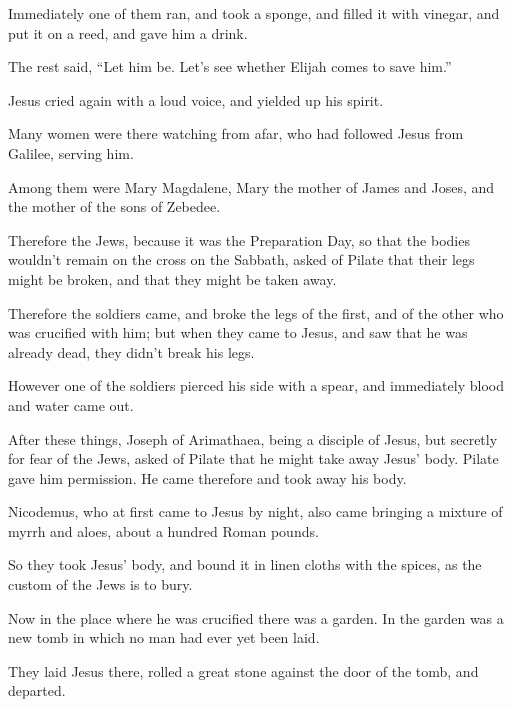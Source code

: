 Immediately one of them ran, and took a sponge, and filled it with vinegar, and put it on a reed, and gave him a drink.

The rest said, “Let him be. Let’s see whether Elijah comes to save him.”

Jesus cried again with a loud voice, and yielded up his spirit.

Many women were there watching from afar, who had followed Jesus from Galilee, serving him.

Among them were Mary Magdalene, Mary the mother of James and Joses, and the mother of the sons of Zebedee.

Therefore the Jews, because it was the Preparation Day, so that the bodies wouldn’t remain on the cross on the Sabbath, asked of Pilate that their legs might be broken, and that they might be taken away.

Therefore the soldiers came, and broke the legs of the first, and of the other who was crucified with him; but when they came to Jesus, and saw that he was already dead, they didn’t break his legs.

However one of the soldiers pierced his side with a spear, and immediately blood and water came out.

After these things, Joseph of Arimathaea, being a disciple of Jesus, but secretly for fear of the Jews, asked of Pilate that he might take away Jesus’ body. Pilate gave him permission. He came therefore and took away his body.

Nicodemus, who at first came to Jesus by night, also came bringing a mixture of myrrh and aloes, about a hundred Roman pounds.

So they took Jesus’ body, and bound it in linen cloths with the spices, as the custom of the Jews is to bury.

Now in the place where he was crucified there was a garden. In the garden was a new tomb in which no man had ever yet been laid.

They laid Jesus there, rolled a great stone against the door of the tomb, and departed.